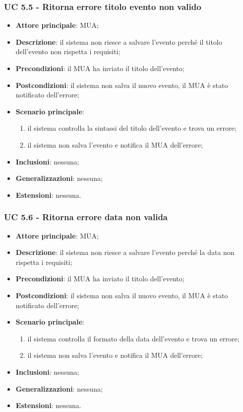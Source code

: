     \subsubsection{UC 5.5 - Ritorna errore titolo evento non valido} \label{sec:UC5.5}
    \begin{itemize}
        \item \textbf{Attore principale}: MUA;
        \item \textbf{Descrizione}: il sistema non riesce a salvare l'evento perché il titolo dell'evento non rispetta i requisiti;
        \item \textbf{Precondizioni}: il MUA ha inviato il titolo dell'evento;
        \item \textbf{Postcondizioni}: il sistema non salva il nuovo evento, il MUA è stato notificato dell'errore;
        \item \textbf{Scenario principale}:
            \begin{enumerate}
                \item il sistema controlla la sintassi del titolo dell'evento e trova un errore;
                \item il sistema non salva l'evento e notifica il MUA dell'errore;
            \end{enumerate}
        \item \textbf{Inclusioni}: nessuna;
        \item \textbf{Generalizzazioni}: nessuna;
        \item \textbf{Estensioni}: nessuna.
    \end{itemize}


    \subsubsection{UC 5.6 - Ritorna errore data non valida} \label{sec:UC5.6}
    \begin{itemize}
        \item \textbf{Attore principale}: MUA;
        \item \textbf{Descrizione}: il sistema non riesce a salvare l'evento perché la data non rispetta i requisiti;
        \item \textbf{Precondizioni}: il MUA ha inviato il titolo dell'evento;
        \item \textbf{Postcondizioni}: il sistema non salva il nuovo evento, il MUA è stato notificato dell'errore;
        \item \textbf{Scenario principale}:
            \begin{enumerate}
                \item il sistema controlla il formato della data dell'evento e trova un errore;
                \item il sistema non salva l'evento e notifica il MUA dell'errore;
            \end{enumerate}
        \item \textbf{Inclusioni}: nessuna;
        \item \textbf{Generalizzazioni}: nessuna;
        \item \textbf{Estensioni}: nessuna.
    \end{itemize}

